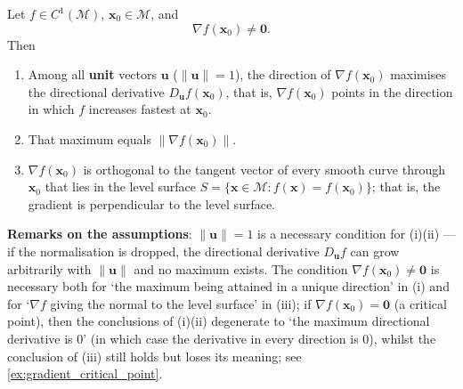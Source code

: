 \begin{proposition}\label{prop:gradient_geometry}
Let $f \in C^1(\mathcal{M})$, $\mathbf{x}_0 \in \mathcal{M}$, and
\[
\nabla f(\mathbf{x}_0) \neq \mathbf{0}.
\]
Then
\begin{enumerate}[label=(\roman*)]
    \item Among all \textbf{unit} vectors $\mathbf u$ ($\|\mathbf u\|=1$), the direction of $\nabla f(\mathbf{x}_0)$ maximises the directional derivative $D_{\mathbf u}f(\mathbf x_0)$, that is, $\nabla f(\mathbf x_0)$ points in the direction in which $f$ increases fastest at $\mathbf x_0$.
    \item That maximum equals $\|\nabla f(\mathbf{x}_0)\|$.
    \item $\nabla f(\mathbf{x}_0)$ is orthogonal to the tangent vector of every smooth curve through $\mathbf{x}_0$ that lies in the level surface $S = \{\mathbf{x} \in \mathcal{M} : f(\mathbf{x}) = f(\mathbf{x}_0)\}$; that is, the gradient is perpendicular to the level surface.
\end{enumerate}

\textbf{Remarks on the assumptions}: $\|\mathbf u\|=1$ is a necessary condition for (i)(ii) --- if the normalisation is dropped, the directional derivative $D_{\mathbf u}f$ can grow arbitrarily with $\|\mathbf u\|$ and no maximum exists. The condition $\nabla f(\mathbf x_0)\ne\mathbf 0$ is necessary both for `the maximum being attained in a unique direction' in (i) and for `$\nabla f$ giving the normal to the level surface' in (iii); if $\nabla f(\mathbf x_0)=\mathbf 0$ (a critical point), then the conclusions of (i)(ii) degenerate to `the maximum directional derivative is $0$' (in which case the derivative in every direction is $0$), whilst the conclusion of (iii) still holds but loses its meaning; see \cref{ex:gradient_critical_point}.
\end{proposition}

